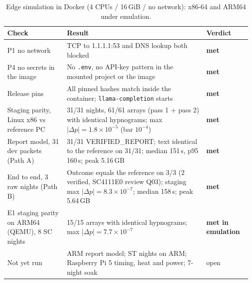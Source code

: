 \begin{table}[htbp]
\centering\small
\caption{Edge simulation in Docker (4 CPUs / 16\,GiB / no network): x86-64 and ARM64 under emulation.}
\label{tab:l1}
\begin{tabularx}{\textwidth}{lYl}
\toprule
Check & Result & Verdict \\
\midrule
P1 no network & TCP to 1.1.1.1:53 and DNS lookup both blocked & \textbf{met} \\
P4 no secrets in the image & No \texttt{.env}, no API-key pattern in the mounted project or the image & \textbf{met} \\
Release pins & All pinned hashes match inside the container; \texttt{llama-completion} starts & \textbf{met} \\
Staging parity, Linux x86 vs reference PC & 31/31 nights, 61/61 arrays (pass 1 + pass 2) with identical hypnograms; max $|\Delta p| = 1.8\times10^{-5}$ (bar $10^{-4}$) & \textbf{met} \\
Report model, 31 dev packets (Path A) & 31/31 VERIFIED\_REPORT; text identical to the reference on 31/31; median 151\,s, p95 160\,s; peak 5.16\,GB & \textbf{met} \\
End to end, 3 raw nights (Path B) & Outcome equals the reference on 3/3 (2 verified, SC4111E0 review Q03); staging max $|\Delta p| = 8.3\times10^{-7}$; median 158\,s; peak 5.64\,GB & \textbf{met} \\
E1 staging parity on ARM64 (QEMU), 8 SC nights & 15/15 arrays with identical hypnograms; max $|\Delta p| = 7.7\times10^{-7}$ & \textbf{met in emulation} \\
Not yet run & ARM report model; ST nights on ARM; Raspberry Pi 5 timing, heat and power; 7-night soak & open \\
\bottomrule
\end{tabularx}
\end{table}

